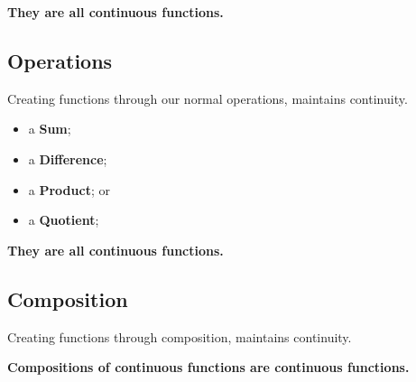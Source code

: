 \documentclass{ximera}
\begin{document}
\begin{center}
\textbf{\textcolor{blue!55!black}{They are all continuous functions.}}   
\end{center}

















\subsection*{Operations}


Creating functions through our normal operations, maintains continuity. 

\begin{itemize}
	\item a \textbf{Sum};
	\item a \textbf{Difference};
	\item a \textbf{Product}; or 
	\item a \textbf{Quotient};
\end{itemize}


\begin{center}
\textbf{\textcolor{blue!55!black}{They are all continuous functions.}}   
\end{center}












\subsection*{Composition}


Creating functions through composition, maintains continuity. 





\begin{center}
\textbf{\textcolor{blue!55!black}{Compositions of continuous functions are continuous functions.}}   
\end{center}
\end{document}
